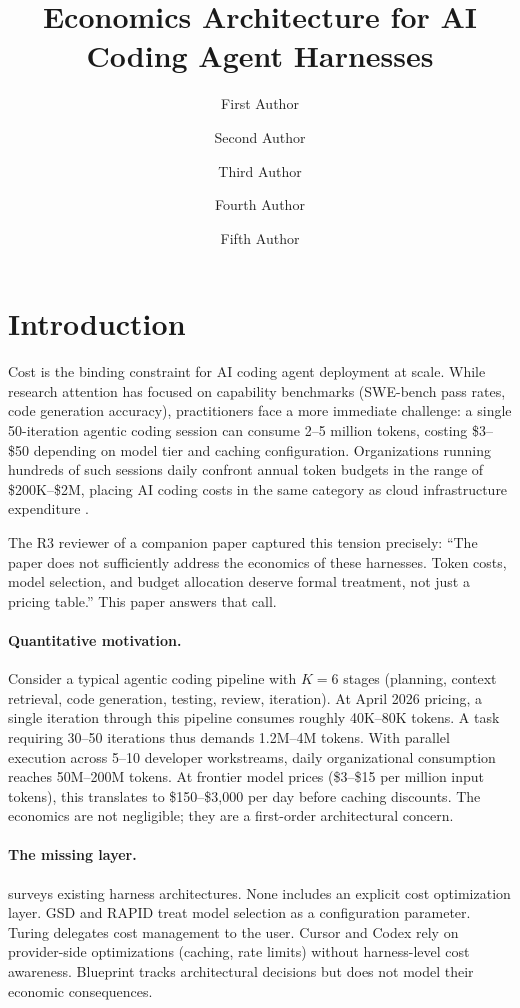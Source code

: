 \documentclass[11pt, a4paper, copyright]{googledeepmind}
\title{Economics Architecture for AI Coding Agent Harnesses}
\author[1]{First Author}
\author[2]{Second Author}
\author[2]{Third Author}
\author[1]{Fourth Author}
\author[1]{Fifth Author}
\affil[*]{Equal Contribution}
\affil[1]{Affiliation 1}
\affil[2]{Affiliation 2}
\begin{document}
\maketitle

\section{Introduction}\label{sec:intro}

Cost is the binding constraint for AI coding agent deployment at scale. While research attention has focused on capability benchmarks (SWE-bench pass rates, code generation accuracy), practitioners face a more immediate challenge: a single 50-iteration agentic coding session can consume 2--5 million tokens, costing \$3--\$50 depending on model tier and caching configuration. Organizations running hundreds of such sessions daily confront annual token budgets in the range of \$200K--\$2M, placing AI coding costs in the same category as cloud infrastructure expenditure \citep{finops2023}.

The R3 reviewer of a companion paper captured this tension precisely: ``The paper does not sufficiently address the economics of these harnesses. Token costs, model selection, and budget allocation deserve formal treatment, not just a pricing table.'' This paper answers that call.

\paragraph{Quantitative motivation.}
Consider a typical agentic coding pipeline with $K = 6$ stages (planning, context retrieval, code generation, testing, review, iteration). At April 2026 pricing, a single iteration through this pipeline consumes roughly 40K--80K tokens. A task requiring 30--50 iterations thus demands 1.2M--4M tokens. With parallel execution across 5--10 developer workstreams, daily organizational consumption reaches 50M--200M tokens. At frontier model prices (\$3--\$15 per million input tokens), this translates to \$150--\$3,000 per day before caching discounts. The economics are not negligible; they are a first-order architectural concern.

\paragraph{The missing layer.}
 surveys existing harness architectures. None includes an explicit cost optimization layer. GSD and RAPID treat model selection as a configuration parameter. Turing delegates cost management to the user. Cursor and Codex rely on provider-side optimizations (caching, rate limits) without harness-level cost awareness. Blueprint tracks architectural decisions but does not model their economic consequences.
\end{document}
